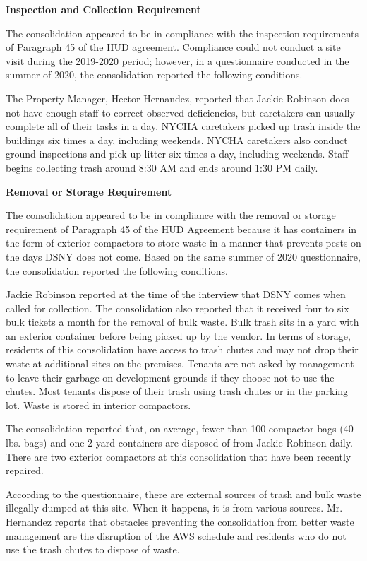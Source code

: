 

\textbf{Inspection and Collection Requirement}

The consolidation appeared to be in compliance with the inspection requirements of Paragraph 45 of the HUD agreement. Compliance could not conduct a site visit during the 2019-2020 period; however, in a questionnaire conducted in the summer of 2020, the consolidation reported the following conditions.

 The Property Manager, Hector Hernandez, reported that Jackie Robinson does not have enough staff to correct observed deficiencies, but caretakers can usually complete all of their tasks in a day. NYCHA caretakers picked up trash inside the buildings six times a day, including weekends. NYCHA caretakers also conduct ground inspections and pick up litter six times a day, including weekends. Staff begins collecting trash around 8:30 AM and ends around 1:30 PM daily.

\textbf{Removal or Storage Requirement}

The consolidation appeared to be in compliance with the  removal or storage requirement of Paragraph  45 of the HUD Agreement because it has containers in the form of exterior compactors to store waste in a manner that prevents pests on the days DSNY does not come. Based on the same summer of  2020 questionnaire, the consolidation reported the following conditions.

Jackie Robinson reported at the time of the interview that DSNY comes when called for collection. The consolidation also reported that it received four to six bulk tickets a month for the removal of bulk waste. Bulk trash sits in a yard with an exterior container before being picked up by the vendor. In terms of storage, residents of this consolidation have access to trash chutes and may not drop their waste at additional sites on the premises. Tenants are not asked by management to leave their garbage on development grounds if they choose not to use the chutes. Most tenants dispose of their trash using trash chutes or in the parking lot. Waste is stored in interior compactors. 

The consolidation reported that, on average, fewer than 100 compactor bags (40 lbs. bags) and one 2-yard containers are disposed of from Jackie Robinson daily. There are two exterior compactors at this consolidation that have been recently repaired. 

 According to the questionnaire, there are external sources of trash and bulk waste illegally dumped at this site. When it happens, it is from various sources. Mr. Hernandez reports that obstacles preventing the consolidation from better waste management are the disruption of the AWS schedule and residents who do not use the trash chutes to dispose of waste.